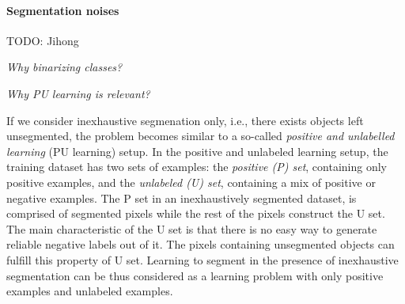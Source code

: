 

\paragraph{Segmentation noises}
{TODO: Jihong}


\noindent \textit{Why binarizing classes?}




\noindent \textit{Why PU learning is relevant?}

If we consider inexhaustive segmenation only, i.e., there exists objects left unsegmented, the problem becomes similar to a so-called \textit{positive and unlabelled learning} (PU learning) setup\cite{li2005learning}.
In the positive and unlabeled learning setup, the training dataset has two sets of examples: the \textit{positive (P) set}, containing only positive examples, and the \textit{unlabeled (U) set}, containing a mix of positive or negative examples.
The P set in an inexhaustively segmented dataset, is comprised of segmented pixels while the rest of the pixels construct the U set.
The main characteristic of the U set is that there is no easy way to generate reliable negative labels out of it.
The pixels containing unsegmented objects can fulfill this property of U set.
Learning to segment in the presence of inexhaustive segmentation can be thus considered as a learning problem with only positive examples and unlabeled examples.


